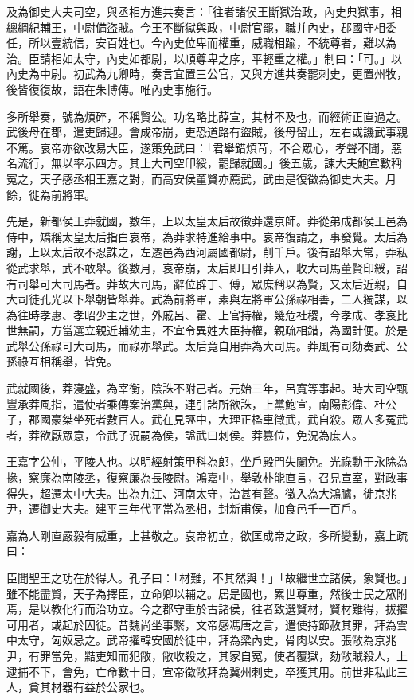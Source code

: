 \begin{pinyinscope}
及為御史大夫司空，與丞相方進共奏言：「往者諸侯王斷獄治政，內史典獄事，相總綱紀輔王，中尉備盜賊。今王不斷獄與政，中尉官罷，職并內史，郡國守相委任，所以壹統信，安百姓也。今內史位卑而權重，威職相踰，不統尊者，難以為治。臣請相如太守，內史如都尉，以順尊卑之序，平輕重之權。」制曰：「可。」以內史為中尉。初武為九卿時，奏言宜置三公官，又與方進共奏罷刺史，更置州牧，後皆復復故，語在朱博傳。唯內史事施行。

多所舉奏，號為煩碎，不稱賢公。功名略比薛宣，其材不及也，而經術正直過之。武後母在郡，遣吏歸迎。會成帝崩，吏恐道路有盜賊，後母留止，左右或譏武事親不篤。哀帝亦欲改易大臣，遂策免武曰：「君舉錯煩苛，不合眾心，孝聲不聞，惡名流行，無以率示四方。其上大司空印綬，罷歸就國。」後五歲，諫大夫鮑宣數稱冤之，天子感丞相王嘉之對，而高安侯董賢亦薦武，武由是復徵為御史大夫。月餘，徙為前將軍。

先是，新都侯王莽就國，數年，上以太皇太后故徵莽還京師。莽從弟成都侯王邑為侍中，矯稱太皇太后指白哀帝，為莽求特進給事中。哀帝復請之，事發覺。太后為謝，上以太后故不忍誅之，左遷邑為西河屬國都尉，削千戶。後有詔舉大常，莽私從武求舉，武不敢舉。後數月，哀帝崩，太后即日引莽入，收大司馬董賢印綬，詔有司舉可大司馬者。莽故大司馬，辭位辟丁、傅，眾庶稱以為賢，又太后近親，自大司徒孔光以下舉朝皆舉莽。武為前將軍，素與左將軍公孫祿相善，二人獨謀，以為往時孝惠、孝昭少主之世，外戚呂、霍、上官持權，幾危社稷，今孝成、孝哀比世無嗣，方當選立親近輔幼主，不宜令異姓大臣持權，親疏相錯，為國計便。於是武舉公孫祿可大司馬，而祿亦舉武。太后竟自用莽為大司馬。莽風有司劾奏武、公孫祿互相稱舉，皆免。

武就國後，莽寖盛，為宰衡，陰誅不附己者。元始三年，呂寬等事起。時大司空甄豐承莽風指，遣使者乘傳案治黨與，連引諸所欲誅，上黨鮑宣，南陽彭偉、杜公子，郡國豪桀坐死者數百人。武在見誣中，大理正檻車徵武，武自殺。眾人多冤武者，莽欲厭眾意，令武子況嗣為侯，諡武曰剌侯。莽篡位，免況為庶人。

王嘉字公仲，平陵人也。以明經射策甲科為郎，坐戶殿門失闌免。光祿勳于永除為掾，察廉為南陵丞，復察廉為長陵尉。鴻嘉中，舉敦朴能直言，召見宣室，對政事得失，超遷太中大夫。出為九江、河南太守，治甚有聲。徵入為大鴻臚，徙京兆尹，遷御史大夫。建平三年代平當為丞相，封新甫侯，加食邑千一百戶。

嘉為人剛直嚴毅有威重，上甚敬之。哀帝初立，欲匡成帝之政，多所變動，嘉上疏曰：

臣聞聖王之功在於得人。孔子曰：「材難，不其然與！」「故繼世立諸侯，象賢也。」雖不能盡賢，天子為擇臣，立命卿以輔之。居是國也，累世尊重，然後士民之眾附焉，是以教化行而治功立。今之郡守重於古諸侯，往者致選賢材，賢材難得，拔擢可用者，或起於囚徒。昔魏尚坐事繫，文帝感馮唐之言，遣使持節赦其罪，拜為雲中太守，匈奴忌之。武帝擢韓安國於徒中，拜為梁內史，骨肉以安。張敞為京兆尹，有罪當免，黠吏知而犯敞，敞收殺之，其家自冤，使者覆獄，劾敞賊殺人，上逮捕不下，會免，亡命數十日，宣帝徵敞拜為冀州刺史，卒獲其用。前世非私此三人，貪其材器有益於公家也。


\end{pinyinscope}
